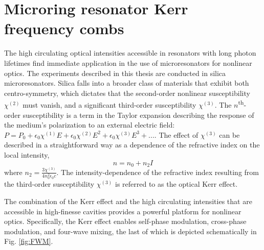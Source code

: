 \section{Microring resonator Kerr frequency combs}

The high circulating optical intensities accessible in resonators with long photon lifetimes find immediate application in the use of microresonators for nonlinear optics. The experiments described in this thesis are conducted in silica microresonators. Silica falls into a broader class of materials that exhibit both centro-symmetry, which dictates that the second-order nonlinear susceptibility $\chi^{(2)}$ must vanish, and a significant third-order susceptibility $\chi^{(3)}$. The $n$\textsuperscript{th}-order susceptibility is a term in the Taylor expansion describing the response of the medium's polarization to an external electric field\cite{Boyd2003}: $P=P_0+\epsilon_0 \chi^{(1)} E + \epsilon_0 \chi^{(2)} E^2 + \epsilon_0 \chi^{(3)} E^3+...$. The effect of $\chi^{(3)}$ can be described in a straightforward way as a dependence of the refractive index on the local intensity\cite{Agrawal2007},
\begin{equation}
n=n_0+n_2 I \label{eq:KerrIndex}
\end{equation}
where $n_2=\frac{3\chi^{(3)}}{4n_0^2\epsilon_0 c}$\cite{DelCoso2004,Agrawal2007}. The intensity-dependence of the refractive index resulting from the third-order susceptibility $\chi^{(3)}$ is referred to as the optical Kerr effect.

The combination of the Kerr effect and the high circulating intensities that are accessible in high-finesse cavities provides a powerful platform for nonlinear optics. Specifically, the Kerr effect enables self-phase modulation, cross-phase modulation, and four-wave mixing, the last of which is depicted schematically in Fig. \ref{fig:FWM}. 


